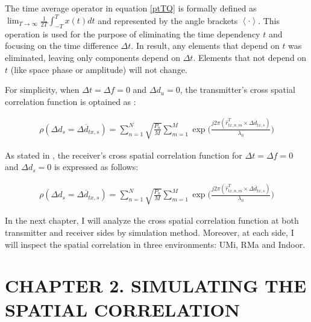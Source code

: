 \documentclass{article} %
\begin{document}
The time average operator in equation \ref{ptTQ} is formally defined as $\lim_{T\rightarrow\infty} \frac{1}{2T} \int_{-T}^{T} x(t)dt$ and represented by the angle brackets $\left\langle \cdot \right\rangle$. This operation is used for the purpose of eliminating the time dependency $t$ and focusing on the time difference $\Delta t$. In result, any elements that depend on $t$ was eliminated, leaving only components depend on $\Delta t$. Elements that not depend on $t$ (like space phase or amplitude) will not change. \cite{scm_onering}

For simplicity, when $\Delta t = \Delta f = 0$ and $\Delta d_u = 0$, the transmitter’s cross spatial correlation function is optained as \cite{final_exam}:
\begin{adjustwidth}{-2cm}{0cm}
\begin{equation} \label{ptBS} 
\begin{split}
    \rho(\Delta d_s = \Delta \overline d_{tx,s}) = \sum_{n=1}^N \sqrt{\frac{P_n}{M}} \sum_{m=1}^M \exp \Big(\frac{j2\pi(\hat{r}_{tx,n,m}^T \times \Delta \overline{d}_{tx,s})}{\lambda_0} \Big)
\end{split}
\end{equation}
\end{adjustwidth}

As stated in \cite{final_exam}, the receiver’s cross spatial correlation function for $\Delta t = \Delta f = 0$ and $\Delta d_s = 0$ is expressed as follows:
\begin{adjustwidth}{-2cm}{0cm}
\begin{equation} \label{ptMS}
\begin{split}
    \rho(\Delta d_s = \Delta \overline d_{tx,s}) = \sum_{n=1}^N \sqrt{\frac{P_n}{M}} \sum_{m=1}^M \exp \Big(\frac{j2\pi(\hat{r}_{tx,n,m}^T \times \Delta \overline{d}_{tx,s})}{\lambda_0} \Big)
\end{split}
\end{equation}
\end{adjustwidth}

In the next chapter, I will analyze the cross spatial correlation function at both transmitter and receiver sides by simulation method. Moreover, at each side, I will inspect the spatial correlation in three environments: UMi, RMa and Indoor.

\clearpage

\section*{CHAPTER 2. SIMULATING THE SPATIAL CORRELATION}
\setcounter{section}{2}
\setcounter{figure}{0}
\setcounter{table}{0}
\setcounter{subsection}{0}
\end{document}
